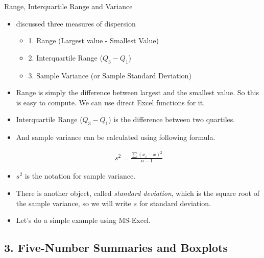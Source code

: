 \documentclass[8pt, usepdftitle=false]{beamer}
\begin{document}
\begin{frame}{Range, Interquartile Range and Variance}

\begin{itemize}
   
   \item \citet*{anderson_statistics_2020} discussed three measures of dispersion 

   \begin{itemize}
     \item 1. Range (Largest value  - Smallest Value)
     \item 2. Interquartile Range ($Q_3 - Q_1$)
     \item 3. Sample Variance (or Sample Standard Deviation)
   \end{itemize}

   \item Range is simply the difference between largest and the smallest value. So this is easy to compute. We can use direct Excel functions for it.

   \item Interquartile Range ($Q_3 - Q_1$) is the difference between two quartiles.

   \item And sample variance can be calculated using following formula.

   \begin{align*}
      s^2=\frac{\sum\left(x_i-\bar{x}\right)^2}{n-1}
    \end{align*} 

    \item $s^2$ is the notation for sample variance.

    \item There is another object, called \emph{standard deviation}, which is the square root of the sample variance, so we will write $s$ for standard deviation.

    \item Let's do a simple example using MS-Excel.

\end{itemize}


\end{frame}

\subsection{3. Five-Number Summaries and Boxplots}
\frame{\subsectionpage}
\end{document}

